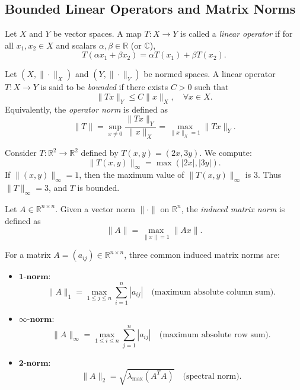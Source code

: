 \subsection{Bounded Linear Operators and Matrix Norms}

\begin{definition}
Let $X$ and $Y$ be vector spaces.  
A map $T:X \to Y$ is called a \emph{linear operator} if for all $x_1,x_2 \in X$ and scalars $\alpha,\beta \in \mathbb{R}$ (or $\mathbb{C}$),
\[
T(\alpha x_1 + \beta x_2) = \alpha T(x_1) + \beta T(x_2).
\]
\end{definition}

\begin{definition}
Let $(X,\|\cdot\|_X)$ and $(Y,\|\cdot\|_Y)$ be normed spaces.  
A linear operator $T:X \to Y$ is said to be \emph{bounded} if there exists $C>0$ such that
\[
\|Tx\|_Y \leq C \|x\|_X, \quad \forall x \in X.
\]
Equivalently, the \emph{operator norm} is defined as
\[
\|T\| = \sup_{x \neq 0} \frac{\|Tx\|_Y}{\|x\|_X} 
= \max_{\|x\|_X = 1} \|Tx\|_Y.
\]
\end{definition}

\begin{example}
Consider $T:\mathbb{R}^2 \to \mathbb{R}^2$ defined by $T(x,y) = (2x,3y)$.  
We compute:
\[
\|T(x,y)\|_\infty = \max(|2x|,|3y|).
\]
If $\|(x,y)\|_\infty = 1$, then the maximum value of $\|T(x,y)\|_\infty$ is $3$.  
Thus $\|T\|_\infty = 3$, and $T$ is bounded.  
\end{example}

\begin{definition}
Let $A \in \mathbb{R}^{n \times n}$.  
Given a vector norm $\|\cdot\|$ on $\mathbb{R}^n$, the \emph{induced matrix norm} is defined as
\[
\|A\| = \max_{\|x\|=1} \|Ax\|.
\]
\end{definition}

\begin{example}
For a matrix $A = (a_{ij}) \in \mathbb{R}^{n \times n}$, three common induced matrix norms are:
\begin{itemize}
    \item $\mathbf{1\text{-norm}}$:  
    \[
    \|A\|_1 = \max_{1 \leq j \leq n} \sum_{i=1}^n |a_{ij}| 
    \quad \text{(maximum absolute column sum)}.
    \]
    \item $\mathbf{\infty\text{-norm}}$:  
    \[
    \|A\|_\infty = \max_{1 \leq i \leq n} \sum_{j=1}^n |a_{ij}| 
    \quad \text{(maximum absolute row sum)}.
    \]
    \item $\mathbf{2\text{-norm}}$:  
    \[
    \|A\|_2 = \sqrt{\lambda_{\max}(A^TA)}
    \quad \text{(spectral norm)}.
    \]
\end{itemize}
\end{example}

